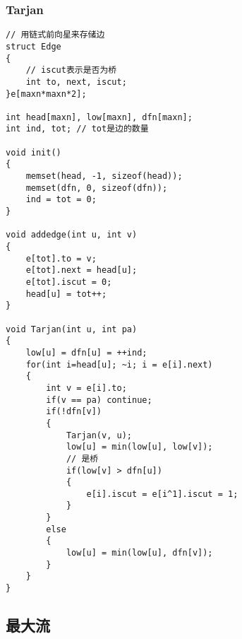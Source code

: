 \subsubsection{Tarjan}
\begin{lstlisting}
// 用链式前向星来存储边
struct Edge
{
	// iscut表示是否为桥
	int to, next, iscut;
}e[maxn*maxn*2];

int head[maxn], low[maxn], dfn[maxn];
int ind, tot; // tot是边的数量

void init()
{
	memset(head, -1, sizeof(head));
	memset(dfn, 0, sizeof(dfn));
	ind = tot = 0;
}

void addedge(int u, int v)
{
	e[tot].to = v;
	e[tot].next = head[u];
	e[tot].iscut = 0;
	head[u] = tot++;
}

void Tarjan(int u, int pa)
{
	low[u] = dfn[u] = ++ind;
	for(int i=head[u]; ~i; i = e[i].next)
	{
		int v = e[i].to;
		if(v == pa) continue;
		if(!dfn[v])
		{
			Tarjan(v, u);
			low[u] = min(low[u], low[v]);
			// 是桥
			if(low[v] > dfn[u])
			{
				e[i].iscut = e[i^1].iscut = 1;
			}
		}
		else
		{
			low[u] = min(low[u], dfn[v]);
		}
	}
}
\end{lstlisting}


\subsection{最大流}

